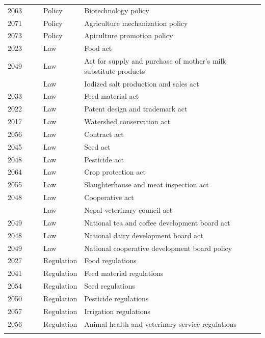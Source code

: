 \documentclass[
  openany]{book}
\begin{document}
\begin{table}[H]
\begin{tabular}[t]{rrrll}
\addlinespace
\rowcolor{gray!6}  2063 &  &  & Policy & Biotechnology policy\\
2071 &  &  & Policy & Agriculture mechanization policy\\
\rowcolor{gray!6}  2073 &  &  & Policy & Apiculture promotion policy\\
2023 &  &  & Law & Food act\\
\rowcolor{gray!6}  2049 &  &  & Law & Act for supply and purchase of mother's milk substitute products\\
\addlinespace
2055 &  &  & Law & Iodized salt production and sales act\\
\rowcolor{gray!6}  2033 &  &  & Law & Feed material act\\
2022 &  &  & Law & Patent design and trademark act\\
\rowcolor{gray!6}  2017 &  &  & Law & Watershed conservation act\\
2056 &  &  & Law & Contract act\\
\addlinespace
\rowcolor{gray!6}  2045 &  &  & Law & Seed act\\
2048 &  &  & Law & Pesticide act\\
\rowcolor{gray!6}  2064 &  &  & Law & Crop protection act\\
2055 &  &  & Law & Slaughterhouse and meat inspection act\\
\rowcolor{gray!6}  2048 &  &  & Law & Cooperative act\\
\addlinespace
2055 &  &  & Law & Nepal veterinary council act\\
\rowcolor{gray!6}  2049 &  &  & Law & National tea and coffee development board act\\
2048 &  &  & Law & National dairy development board act\\
\rowcolor{gray!6}  2049 &  &  & Law & National cooperative development board policy\\
2027 &  &  & Regulation & Food regulations\\
\addlinespace
\rowcolor{gray!6}  2041 &  &  & Regulation & Feed material regulations\\
2054 &  &  & Regulation & Seed regulations\\
\rowcolor{gray!6}  2050 &  &  & Regulation & Pesticide regulations\\
2057 &  &  & Regulation & Irrigation regulations\\
\rowcolor{gray!6}  2056 &  &  & Regulation & Animal health and veterinary service regulations\\
\addlinespace

\end{tabular}
\end{table}
\end{document}
